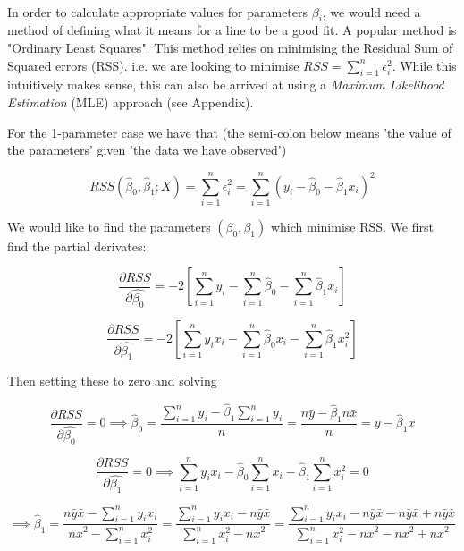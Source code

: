 \documentclass[11pt]{article}
\begin{document}
    \begin{center}
    \end{center}
    { \hspace*{\fill} \\}
    
    In order to calculate appropriate values for parameters \(\beta_i\), we
would need a method of defining what it means for a line to be a good
fit. A popular method is "Ordinary Least Squares". This method relies on
minimising the Residual Sum of Squared errors (RSS). i.e. we are looking
to minimise \(RSS = \sum_{i=1}^n \epsilon_i^2\). While this intuitively
makes sense, this can also be arrived at using a \emph{Maximum
Likelihood Estimation} (MLE) approach (see Appendix).

For the 1-parameter case we have that (the semi-colon below means 'the
value of the parameters' given 'the data we have observed')

\[RSS(\hat{\beta}_0,\hat{\beta}_1;X) = \sum_{i=1}^n \epsilon_i^2 = \sum_{i=1}^n (y_i-\hat{\beta}_0 - \hat{\beta}_1 x_i)^2\]

We would like to find the parameters \((\beta_0,\beta_1)\) which
minimise RSS. We first find the partial derivates:

\[\frac{\partial RSS}{\partial \hat{\beta_0}} = -2 [ \sum_{i=1}^n y_i - \sum_{i=1}^n \hat{\beta}_0 - \sum_{i=1}^n \hat{\beta}_1 x_i]\]

\[\frac{\partial RSS}{\partial \hat{\beta_1}} = -2 [ \sum_{i=1}^n y_i x_i - \sum_{i=1}^n \hat{\beta}_0 x_i - \sum_{i=1}^n \hat{\beta}_1 x_i^2]\]

Then setting these to zero and solving

\[\frac{\partial RSS}{\partial \hat{\beta_0}} = 0 \implies  \hat{\beta}_0 = \frac{\sum_{i=1}^n y_i - \hat{\beta}_1 \sum_{i=1}^n y_i}{n} = \frac{n \bar{y} - \hat{\beta}_1 n \bar{x}}{n} = \bar{y} - \hat{\beta}_1 \bar{x}\]

\[\frac{\partial RSS}{\partial \hat{\beta_1}} = 0 \implies  \sum_{i=1}^n y_i x_i - \hat{\beta}_0 \sum_{i=1}^n x_i - \hat{\beta}_1 \sum_{i=1}^n x_i^2 = 0\]

\[\implies \hat{\beta}_1 = \frac{n \bar{y} \bar{x} - \sum_{i=1}^n y_i x_i}{n \bar{x}^2 - \sum_{i=1}^n x_i^2} = \frac{\sum_{i=1}^n y_i x_i - n \bar{y} \bar{x}}{\sum_{i=1}^n x_i^2 - n \bar{x}^2} = \frac{\sum_{i=1}^n y_i x_i - n \bar{y} \bar{x} - n \bar{y} \bar{x} + n\bar{y} \bar{x}}{\sum_{i=1}^n x_i^2 - n \bar{x}^2 -n\bar{x}^2 + n\bar{x}^2}\]
\end{document}
